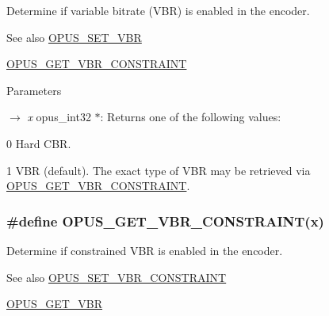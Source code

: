 Determine if variable bitrate (VBR) is enabled in the encoder. \begin{DoxySeeAlso}{See also}
\hyperlink{group__opus__encoderctls_ga34d09ae06cab7e1a6c49876249b67892}{OPUS\_\-SET\_\-VBR} 

\hyperlink{group__opus__encoderctls_gab35fa5691ba0dd932031b7839c47513c}{OPUS\_\-GET\_\-VBR\_\-CONSTRAINT} 
\end{DoxySeeAlso}

\begin{DoxyParams}{Parameters}
\item[\mbox{$\rightarrow$} {\em x}]{\ttfamily opus\_\-int32 $\ast$}: Returns one of the following values: 
\begin{DoxyDescription}
\item[0]Hard CBR. 
\item[1]VBR (default). The exact type of VBR may be retrieved via \hyperlink{group__opus__encoderctls_gab35fa5691ba0dd932031b7839c47513c}{OPUS\_\-GET\_\-VBR\_\-CONSTRAINT}. 
\end{DoxyDescription}\end{DoxyParams}
\hypertarget{group__opus__encoderctls_gab35fa5691ba0dd932031b7839c47513c}{
\subsubsection[{OPUS\_\-GET\_\-VBR\_\-CONSTRAINT}]{\setlength{\rightskip}{0pt plus 5cm}\#define OPUS\_\-GET\_\-VBR\_\-CONSTRAINT(x)}}
\label{group__opus__encoderctls_gab35fa5691ba0dd932031b7839c47513c}


Determine if constrained VBR is enabled in the encoder. \begin{DoxySeeAlso}{See also}
\hyperlink{group__opus__encoderctls_gab1b534a4fe55373f1be407ad4b2b22bd}{OPUS\_\-SET\_\-VBR\_\-CONSTRAINT} 

\hyperlink{group__opus__encoderctls_ga58feba30c167962305ec268e6abe8c08}{OPUS\_\-GET\_\-VBR} 
\end{DoxySeeAlso}

